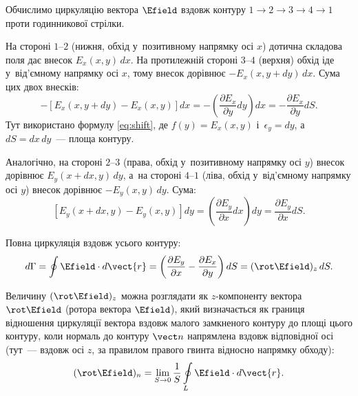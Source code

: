 Обчислимо циркуляцію вектора $\Efield$ вздовж контуру $1\to2\to3\to4\to1$ проти
годинникової стрілки.

На стороні $1$--$2$ (нижня, обхід у~позитивному напрямку осі $x$) дотична складова поля
дає внесок $E_x(x,y)\,dx$. На протилежній стороні $3$--$4$ (верхня) обхід іде у~від'ємному
напрямку осі $x$, тому внесок дорівнює $-E_x(x, y+dy)\,dx$. Сума цих двох внесків:
\begin{equation*}
	-\left[E_x(x, y+dy) - E_x(x,y) \right] dx = -\left( \frac{\partial
		E_x}{\partial y} dy\right) dx = -\frac{\partial
		E_x}{\partial y} dS.
\end{equation*}
Тут використано формулу \eqref{eq:shift}, де $f(y) = E_x(x,y)$ і~$\epsilon_y = dy$,
а~$dS = dx\,dy$~--- площа контуру.

Аналогічно, на стороні $2$--$3$ (права, обхід у~позитивному напрямку осі $y$) внесок
дорівнює $E_y(x+dx, y)\,dy$, а~на стороні $4$--$1$ (ліва, обхід у~від'ємному напрямку осі
$y$) внесок дорівнює $-E_y(x,y)\,dy$. Сума:
\begin{equation*}
	\left[E_y(x+dx, y) - E_y(x,y) \right] dy = \left( \frac{\partial
		E_y}{\partial x} dx\right) dy = \frac{\partial
		E_y}{\partial x} dS.
\end{equation*}

Повна циркуляція вздовж усього контуру:
\begin{equation*}
	d\Gamma = \oint \Efield \cdot d\vect{r} = \left( \frac{\partial
		E_y}{\partial x} - \frac{\partial E_x}{\partial y} \right) dS =
	(\rot\Efield)_z\, dS.
\end{equation*}

Величину $(\rot\Efield)_z$ можна розглядати як $z$-компоненту вектора $\rot\Efield$
(ротора вектора $\Efield$), який визначається як границя відношення циркуляції вектора
вздовж малого замкненого контуру до площі цього контуру, коли нормаль до контуру $\vect n$
напрямлена вздовж відповідної осі (тут~--- вздовж осі $z$, за правилом правого гвинта
відносно напрямку обходу):
\begin{equation*}
	(\rot\Efield)_n = \lim_{S \to 0} \frac{1}{S}\oint\limits_L \Efield \cdot d\vect{r}.
\end{equation*}

